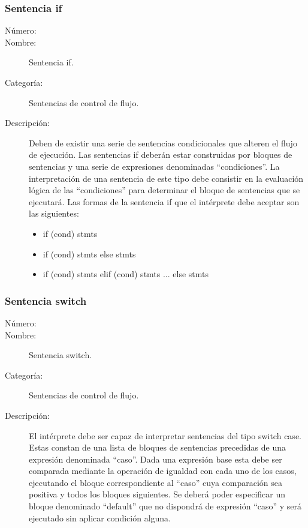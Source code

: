 \subsubsection{Sentencia if} 
	\begin{description}
		\item [Número:] \cn
		\item [Nombre:] Sentencia if.
		\item [Categoría:] Sentencias de control de flujo.
		\item [Descripción:] Deben de existir una serie de sentencias condicionales que alteren el flujo de ejecución. Las  
		sentencias if deberán estar construidas por bloques de sentencias y una serie de expresiones denominadas ``condiciones''.
		La interpretación de una sentencia de este tipo debe consistir en la evaluación lógica de las ``condiciones'' para determinar el
		bloque de sentencias que se ejecutará. Las formas de la sentencia if que el intérprete debe aceptar son las siguientes:
		\begin{itemize}
			\item if (cond) stmts
			\item if (cond) stmts else stmts
			\item if (cond) stmts elif (cond) stmts ... else stmts
		\end{itemize}
	\end {description}

\subsubsection{Sentencia switch}
	\begin{description}
		\item [Número:] \cn
		\item [Nombre:] Sentencia switch.
		\item [Categoría:] Sentencias de control de flujo.
		\item [Descripción:] El intérprete debe ser capaz de interpretar sentencias del tipo switch case. Estas
		constan de una lista de bloques de sentencias precedidas de una expresión denominada ``caso''. Dada una expresión base
		esta debe ser comparada mediante la operación de igualdad con cada uno de los casos, ejecutando el bloque correspondiente al ``caso''
		cuya comparación sea positiva y todos los bloques siguientes. Se deberá poder especificar un bloque denominado ``default''
		que no dispondrá de expresión ``caso'' y será ejecutado sin aplicar condición alguna.
	\end {description}

